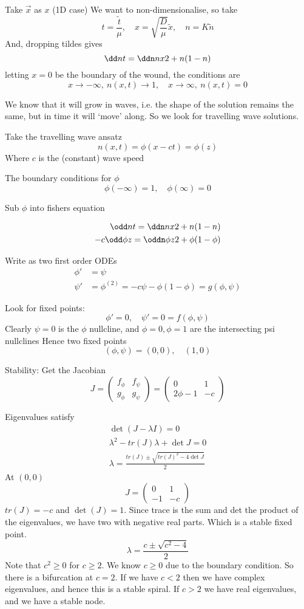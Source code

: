 \documentclass{X:/Documents/Coding/Latex/myassignment}
\begin{document}
Take $\vec x$ as $x$ (1D case)
We want to non-dimensionalise, so take
\[t = \frac{\tilde{t}}{\mu}, \quad x = \sqrt{\frac{D}{\mu}}\tilde x,\quad n= K\tilde{n}\]
And, dropping tildes gives
\[\dd nt = \ddn nx2 + n(1-n)\]
letting $x=0$ be the boundary of the wound, the conditions are
\[x\to-\infty, \ n(x,t) \to 1, \quad x\to\infty,\ n(x,t)= 0\]

We know that it will grow in waves, i.e. the shape of the solution remains the same, but in time it will `move' along. So we look for travelling wave solutions.

Take the travelling wave ansatz
\[n(x,t) = \phi(x-ct) = \phi(z)\]
Where $c$ is the (constant) wave speed

The boundary conditions for $\phi$
\[\phi(-\infty) = 1, \quad \phi(\infty) = 0\]

Sub $\phi$ into fishers equation

\begin{align*}
	\odd nt = \ddn nx2 + n(1-n)\\
	-c \odd \phi z = \oddn \phi z2 + \phi(1- \phi)\\ 
\end{align*}

Write as two first order ODEs
\begin{align*}
	\phi' &= \psi\\
	\psi' &= \phi^{(2)} = -c \psi - \phi(1-\phi) = g(\phi,\psi)
\end{align*}

Look for fixed points:
\[\phi' = 0, \quad \psi' = 0 = f(\phi,\psi)\]
Clearly $\psi = 0 $ is the $\phi$ nullcline, and $\phi = 0, \phi =1$ are the intersecting psi nullclines
Hence two fixed points
\[(\phi,\psi) = (0,0), \quad (1,0)\]

Stability:
Get the Jacobian
\[J = \begin{pmatrix}
	f_\phi & f_\psi\\ 
	g_\phi & g_\psi
\end{pmatrix}=\begin{pmatrix}
	0&1\\
	 2\phi -1&-c
\end{pmatrix}\]

Eigenvalues satisfy
\begin{align*}
	\det (J-\lambda I) = 0\\
	\lambda^2 - tr(J) \lambda + \det J = 0\\
	\lambda = \frac{tr(J) \pm \sqrt{tr(J)^2 - 4\det J}}{2}
\end{align*}
At $(0,0)$
\[
	J = \begin{pmatrix}
		0&1\\-1&-c
	\end{pmatrix}	
\] 
$tr(J) = -c$ and $\det(J) = 1$. Since trace is the sum and det the product of the eigenvalues, we have two with negative real parts. Which is a stable fixed point.
\[\lambda = \frac{c \pm \sqrt{c^2 - 4}}{2}\]
Note that $c^2 \geq 0$ for $c \geq 2$. We know $c\geq 0$ due to the boundary condition. So there is a bifurcation at $c = 2$.
If we have $c < 2$ then we have complex eigenvalues, and hence this is a stable spiral.
If $c > 2$ we have real eigenvalues, and we have a stable node.
\end{document}
